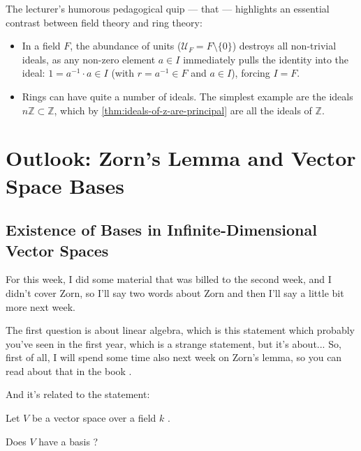 \begin{insight}
The lecturer's humorous pedagogical quip --- that  --- highlights an essential contrast between field theory and ring theory:
\begin{itemize}
    \item In a field $F$, the abundance of units ($\mathcal{U}_F = F \setminus \{0\}$) destroys all non-trivial ideals, as any non-zero element $a \in I$ immediately pulls the identity into the ideal: $1 = a^{-1} \cdot a \in I$ (with $r = a^{-1} \in F$ and $a \in I$), forcing $I = F$.
    \item Rings can have quite a number of ideals. The simplest example are the ideals $n\mathbb{Z} \subset \mathbb{Z}$, which by \cref{thm:ideals-of-z-are-principal} are all the ideals of $\mathbb{Z}$.
\end{itemize}
\end{insight}

\section{Outlook: Zorn's Lemma and Vector Space Bases}
\subsection{Existence of Bases in Infinite-Dimensional Vector Spaces}

\begin{speech}[00:42:20 - 00:43:29]
For this week, I did some material that was billed to the second week, and I didn't cover Zorn, so I'll say two words about Zorn and then I'll say a little bit more next week.

The first question is about linear algebra, which is this statement which  probably you've seen in the first year, which is a strange statement, but it's about... So, first of all, I will spend some time also next week on Zorn's lemma, so you can read about that in the book .

And it's related to the statement:

Let $V$ be a vector space over a field $k$ .

Does $V$ have a basis ?
\end{speech}

